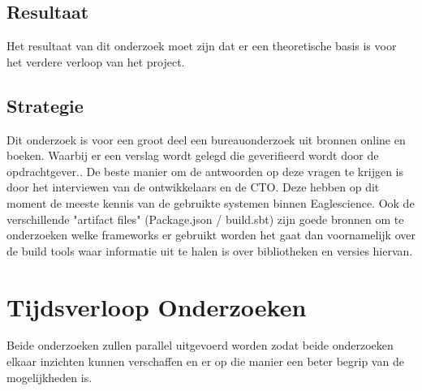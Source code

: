 \subsection{Resultaat}\label{subsec:resultaat}%
Het resultaat van dit onderzoek moet zijn dat er een theoretische basis is voor het verdere verloop van het project.
\subsection{Strategie}\label{subsec:strategie}
Dit onderzoek is voor een groot deel een bureauonderzoek uit bronnen online en boeken.
Waarbij er een verslag wordt gelegd die geverifieerd wordt door de opdrachtgever..
De beste manier om de antwoorden op deze vragen te krijgen is door het interviewen van de ontwikkelaars en de CTO. Deze hebben op dit moment de meeste kennis van de gebruikte systemen binnen Eaglescience.
Ook de verschillende "artifact files" (Package.json / build.sbt) zijn goede bronnen om te onderzoeken welke frameworks er gebruikt worden het gaat dan voornamelijk over de build tools waar informatie uit te halen is over bibliotheken en versies hiervan.

\section{Tijdsverloop Onderzoeken}\label{sec:tijdsverloop-onderzoeken}
Beide onderzoeken zullen parallel uitgevoerd worden zodat beide onderzoeken elkaar inzichten kunnen verschaffen en er op die manier een beter begrip van de mogelijkheden is.
